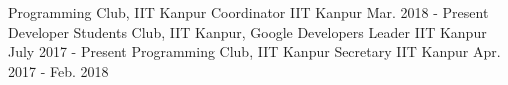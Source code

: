 

\begin{cventries}

  \extraentry
  {Programming Club, IIT Kanpur}
  {Coordinator}
  {IIT Kanpur}
  {Mar. 2018 - Present}
  {
  }
  \vspace{-0.3cm}
  \extraentry
  {Developer Students Club, IIT Kanpur, Google Developers}
  {Leader}
  {IIT Kanpur}
  {July 2017 - Present}
  {
  }
  \vspace{-0.3cm}
  \extraentry
  {Programming Club, IIT Kanpur}
  {Secretary}
  {IIT Kanpur}
  {Apr. 2017 - Feb. 2018}
  {
  }
  \vspace{-0.3cm}

\end{cventries}
